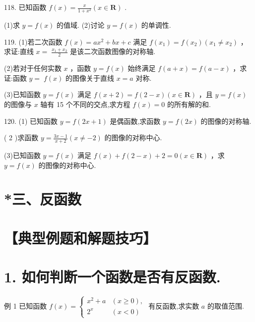 \documentclass[10pt]{article}
\begin{document}
118. 已知函数 \(f\left( x\right)  = \frac{x}{1 + {x}^{2}}\left( {x \in  \mathbf{R}}\right)\) .

(1)求 \(y = f\left( x\right)\) 的值域. (2)讨论 \(y = f\left( x\right)\) 的单调性.

119. (1)若二次函数 \(f\left( x\right)  = a{x}^{2} + {bx} + c\) 满足 \(f\left( {x}_{1}\right)  = f\left( {x}_{2}\right) \left( {{x}_{1} \neq  {x}_{2}}\right)\) ，求证:直线 \(x = \; \frac{{x}_{1} + {x}_{2}}{2}\) 是该二次函数图像的对称轴.

(2)若对于任何实数 \(x\) ，函数 \(y = f\left( x\right)\) 始终满足 \(f\left( {a + x}\right)  = f\left( {a - x}\right)\) ，求证:函数 \(y = \; f\left( x\right)\) 的图像关于直线 \(x = a\) 对称.

(3)已知函数 \(y = f\left( x\right)\) 满足 \(f\left( {x + 2}\right)  = f\left( {2 - x}\right) \left( {x \in  \mathbf{R}}\right)\) ，且 \(y = f\left( x\right)\) 的图像与 \(x\) 轴有 15 个不同的交点,求方程 \(f\left( x\right)  = 0\) 的所有解的和.

120. (1) 已知函数 \(y = f\left( {{2x} + 1}\right)\) 是偶函数,求函数 \(y = f\left( {2x}\right)\) 的图像的对称轴.

( 2 )求函数 \(y = \frac{{3x} - 1}{x + 2}\left( {x \neq   - 2}\right)\) 的图像的对称中心.

(3)已知函数 \(y = f\left( x\right)\) 满足 \(f\left( x\right)  + f\left( {2 - x}\right)  + 2 = 0\left( {x \in  \mathbf{R}}\right)\) ，求 \(y = f\left( x\right)\) 的图像的对称中心.

\section*{*三、反函数}

\section*{【典型例题和解题技巧】}

\section*{1. 如何判断一个函数是否有反函数.}

例 1 已知函数 \(f\left( x\right)  = \left\{  \begin{matrix} {x}^{2} + a & \left( {x \geq  0}\right) , \\  {2}^{x} & \left( {x < 0}\right)  \end{matrix}\right.\) 有反函数,求实数 \(a\) 的取值范围.
\end{document}
